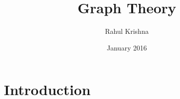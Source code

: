 \documentclass{article}
\title{Graph Theory}
\author{Rahul Krishna}
\date{January 2016}
\begin{document}
\maketitle

\section{Introduction}
\end{document}
